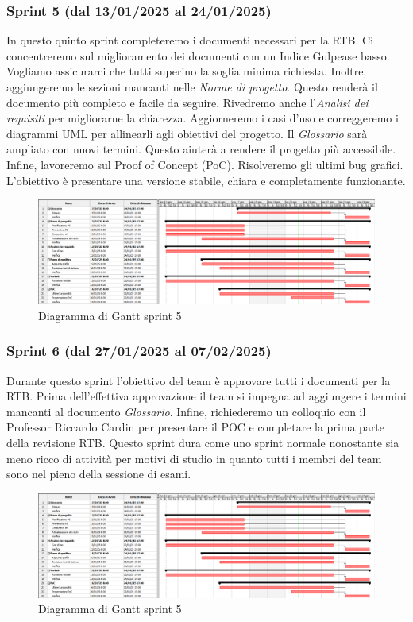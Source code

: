         \subsubsection{Sprint 5 (dal 13/01/2025 al 24/01/2025)}
        In questo quinto sprint completeremo i documenti necessari per la RTB.
        Ci concentreremo sul miglioramento dei documenti con un Indice Gulpease basso. Vogliamo assicurarci che tutti superino la soglia minima richiesta.
        Inoltre, aggiungeremo le sezioni mancanti nelle \textit{Norme di progetto}. Questo renderà il documento più completo e facile da seguire.
        Rivedremo anche l'\textit{Analisi dei requisiti} per migliorarne la chiarezza. Aggiorneremo i casi d'uso e correggeremo i diagrammi UML per allinearli agli obiettivi del progetto.
        Il \textit{Glossario} sarà ampliato con nuovi termini. Questo aiuterà a rendere il progetto più accessibile.
        Infine, lavoreremo sul Proof of Concept (PoC). Risolveremo gli ultimi bug grafici. L'obiettivo è presentare una versione stabile, chiara e completamente funzionante.
                
        \begin{figure}[h!]
            \centering
            \includegraphics[scale = 0.4]{template/images/gantt5.png}
            \caption{Diagramma di Gantt sprint 5}
            \label{fig:3.4} %
        \end{figure}

        \subsubsection{Sprint 6 (dal 27/01/2025 al 07/02/2025)}
        Durante questo sprint l'obiettivo del team è approvare tutti i documenti per la RTB.
        Prima dell'effettiva approvazione il team si impegna ad aggiungere i termini mancanti al documento \textit{Glossario}.
        Infine, richiederemo un colloquio con il Professor Riccardo Cardin per presentare il POC e completare la prima parte della revisione RTB.
        Questo sprint dura come uno sprint normale nonostante sia meno ricco di attività per motivi di studio in quanto tutti i membri del team sono nel pieno
        della sessione di esami.
                
        \begin{figure}[h!]
            \centering
            \includegraphics[scale = 0.4]{template/images/gantt5.png}
            \caption{Diagramma di Gantt sprint 5}
            \label{fig:3.4} %
        \end{figure}

 
